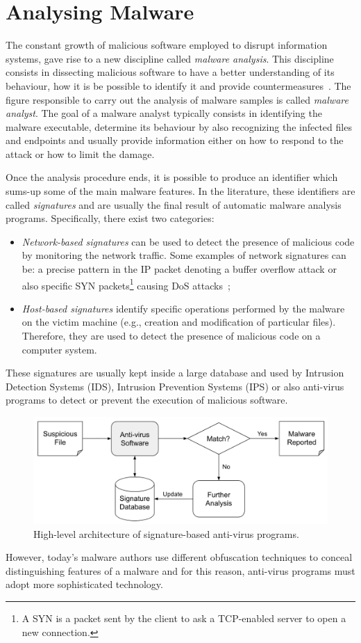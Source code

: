 \documentclass[LaM,binding=0.6cm]{sapthesis}
\begin{document}
\newpage
\section{Analysing Malware}
The constant growth of malicious software employed to disrupt information systems, gave rise to a new discipline called \textit{malware analysis}. This discipline consists in dissecting malicious software to have a better understanding of its behaviour, how it is be possible to identify it and provide countermeasures~\cite{sikorski2012practical}. The figure responsible to carry out the analysis of malware samples is called \textit{malware analyst}. The goal of a malware analyst typically consists in identifying the malware executable, determine its behaviour by also recognizing the infected files and endpoints and usually provide information either on how to respond to the attack or how to limit the damage.

Once the analysis procedure ends, it is possible to produce an identifier which sums-up some of the main malware features. In the literature, these identifiers are called \textit{signatures} and are usually the final result of automatic malware analysis programs. Specifically, there exist two categories:
\begin{itemize}
\item \textit{Network-based signatures} can be used to detect the presence of malicious code by monitoring the network traffic. Some examples of network signatures can be: a precise pattern in the IP packet denoting a buffer overflow attack or also specific SYN packets\footnote{A SYN is a packet sent by the client to ask a TCP-enabled server to open a new connection.} causing DoS attacks~\cite{fuchsberger2005intrusion};
\item \textit{Host-based signatures} identify specific operations performed by the malware on the victim machine (e.g., creation and modification of particular files). Therefore, they are used to detect the presence of malicious code on a computer system.
\end{itemize}
These signatures are usually kept inside a large database and used by Intrusion Detection Systems (IDS), Intrusion Prevention Systems (IPS) or also anti-virus programs to detect or prevent the execution of malicious software. 
\begin{figure}[h!]
\centering
\includegraphics[scale=.5]{images/background2}
\caption{High-level architecture of signature-based anti-virus programs.}
\end{figure}
\newpage
\noindent
However, today's malware authors use different obfuscation techniques to conceal distinguishing features of a malware and for this reason, anti-virus programs must adopt more 
sophisticated technology.\\
\end{document}
